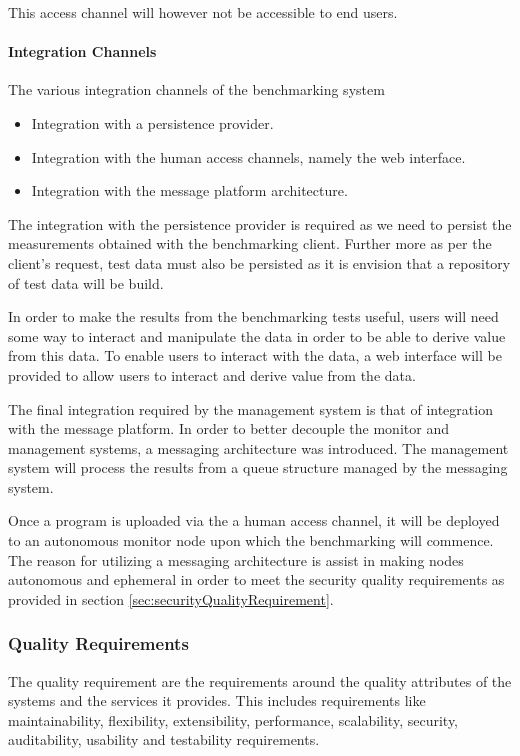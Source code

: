 This access channel will however not be accessible to end users.

\paragraph*{Integration Channels}
The various integration channels of the benchmarking system
\begin{itemize}
	\item Integration with a persistence provider.
	\item Integration with the human access channels, namely the web interface.
	\item Integration with the message platform architecture.
\end{itemize}

The integration with the persistence provider is required as we need to persist
the measurements obtained with the benchmarking client. Further more as per the
client's request, test data must also be persisted as it is envision that a
repository of test data will be build.

In order to make the results from the benchmarking tests useful, users will
need some way to interact and manipulate the data in order to be able to
derive value from this data. To enable users to interact with the data,
a web interface will be provided to allow users to interact and derive value 
from the data.

The final integration required by the management system is that of integration
with the message platform. In order to better decouple the monitor and
management systems, a messaging architecture was introduced. The management
system will process the results from a queue structure managed by the messaging
system. 

Once a program is uploaded via the a human access channel, it will be deployed
to an autonomous monitor node upon which the benchmarking will commence.  The 
reason for utilizing a messaging architecture is assist in making nodes autonomous
and ephemeral in order to meet the security quality requirements as provided in
section \ref{sec:securityQualityRequirement}.

\subsubsection{Quality Requirements}
\label{sec:qualityRequirementManagementSystem}
The quality requirement are the requirements around the quality attributes of
the systems and the services it provides. This includes requirements like
maintainability, flexibility, extensibility, performance, scalability, security,
auditability, usability and testability requirements.


